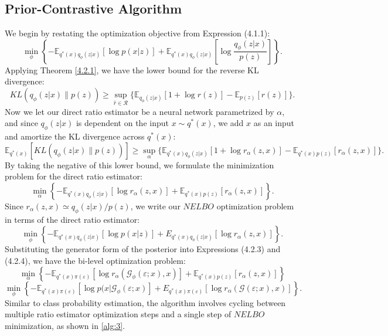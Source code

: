\documentclass[honours,12pt, twoside]{unswthesis}
\newcommand{\E}{\mathbb{E}}
\numberwithin{equation}{section}
\theoremstyle{definition}
\begin{document}
\subsection{Prior-Contrastive Algorithm}\label{sec:4.2.2}
We begin by restating the optimization objective from Expression (4.1.1):
\[\min_\phi \left\lbrace-\mathbb{E}_{q^*(x)q_\phi(z|x)}[\log p(x|z)]+\mathbb{E}_{q^*(x)q_\phi(z|x)}\left[\log \frac{q_\phi(z|x)}{p(z)}\right]\right\rbrace.\]
Applying Theorem \ref{4.2.1}, we have the lower bound for the reverse KL divergence:
\[KL(q_\phi(z|x)\|p(z))\geq \sup_{\hat{r}\in \mathcal{R}}\{\mathbb{E}_{q_\phi(z|x)}[1+\log r(z)]-\mathbb{E}_{p(z)}[r(z)]\}.\]
Now we let our direct ratio estimator be a neural network parametrized by $\alpha$, and since $q_\phi(z|x)$ is dependent on the input $x\sim q^*(x)$, we add $x$ as an input and amortize the KL divergence across $q^*(x)$:
\[\mathbb{E}_{q^*(x)}\left[KL(q_\phi(z|x)\|p(z))\right]\geq \sup_\alpha \{\mathbb{E}_{q^*(x)q_\phi(z|x)}[1+\log r_\alpha(z,x)]-\mathbb{E}_{q^*(x)p(z)}[r_\alpha (z,x)]\}.\]
By taking the negative of this lower bound, we formulate the minimization problem for the direct ratio estimator:
\begin{equation}
\min_\alpha \left\lbrace-\E_{q^*(x)q_\phi(z|x)}[\log r_\alpha(z,x)]+\E_{q^*(x)p(z)}[r_\alpha (z,x)]\right\rbrace.
\end{equation}
Since $r_\alpha(z,x)\simeq q_\phi(z|x)/p(z)$, we write our $NELBO$ optimization problem in terms of the direct ratio estimator:
\begin{equation}
\min_\phi \left\lbrace-\mathbb{E}_{q^*(x)q_\phi(z|x)}\left[\log p(x|z)\right]+E_{q^*(x)q_\phi (z|x)}[\log r_\alpha(z,x)]\right\rbrace.
\end{equation}
Substituting the generator form of the posterior into Expressions (4.2.3) and (4.2.4), we have the bi-level optimization problem:
\[\min_\alpha \left\lbrace-\mathbb{E}_{q^*(x)\pi(\varepsilon)}[\log r_\alpha(\mathcal{G}_\phi(\varepsilon;x),x)]+\mathbb{E}_{q^*(x)p(z)}[r_\alpha(z,x)]\right\rbrace\]
\[\min_\phi \left\lbrace-\mathbb{E}_{q^*(x)\pi(\varepsilon)}\left[\log p(x|\mathcal{G}_\phi(\varepsilon;x)\right]+E_{q^*(x)\pi(\varepsilon)}[\log r_\alpha(\mathcal{G}(\varepsilon;x),x)]\right\rbrace.\]
Similar to class probability estimation, the algorithm involves cycling between multiple ratio estimator optimization steps and a single step of $NELBO$ minimization, as shown in \autoref{alg:3}.
\end{document}
